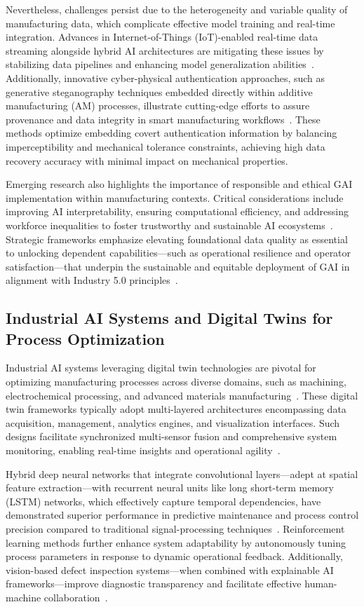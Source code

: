 \documentclass[sigconf]{acmart}
\begin{document}
Nevertheless, challenges persist due to the heterogeneity and variable quality of manufacturing data, which complicate effective model training and real-time integration. Advances in Internet-of-Things (IoT)-enabled real-time data streaming alongside hybrid AI architectures are mitigating these issues by stabilizing data pipelines and enhancing model generalization abilities~\cite{ref20,ref29}. Additionally, innovative cyber-physical authentication approaches, such as generative steganography techniques embedded directly within additive manufacturing (AM) processes, illustrate cutting-edge efforts to assure provenance and data integrity in smart manufacturing workflows~\cite{ref10}. These methods optimize embedding covert authentication information by balancing imperceptibility and mechanical tolerance constraints, achieving high data recovery accuracy with minimal impact on mechanical properties.

Emerging research also highlights the importance of responsible and ethical GAI implementation within manufacturing contexts. Critical considerations include improving AI interpretability, ensuring computational efficiency, and addressing workforce inequalities to foster trustworthy and sustainable AI ecosystems~\cite{ref43}. Strategic frameworks emphasize elevating foundational data quality as essential to unlocking dependent capabilities—such as operational resilience and operator satisfaction—that underpin the sustainable and equitable deployment of GAI in alignment with Industry 5.0 principles~\cite{ref1}.

\subsection{Industrial AI Systems and Digital Twins for Process Optimization}

Industrial AI systems leveraging digital twin technologies are pivotal for optimizing manufacturing processes across diverse domains, such as machining, electrochemical processing, and advanced materials manufacturing~\cite{ref6,ref33}. These digital twin frameworks typically adopt multi-layered architectures encompassing data acquisition, management, analytics engines, and visualization interfaces. Such designs facilitate synchronized multi-sensor fusion and comprehensive system monitoring, enabling real-time insights and operational agility~\cite{ref35,ref45}.

Hybrid deep neural networks that integrate convolutional layers—adept at spatial feature extraction—with recurrent neural units like long short-term memory (LSTM) networks, which effectively capture temporal dependencies, have demonstrated superior performance in predictive maintenance and process control precision compared to traditional signal-processing techniques~\cite{ref4,ref15,ref38}. Reinforcement learning methods further enhance system adaptability by autonomously tuning process parameters in response to dynamic operational feedback. Additionally, vision-based defect inspection systems—when combined with explainable AI frameworks—improve diagnostic transparency and facilitate effective human-machine collaboration~\cite{ref39}.
\end{document}
